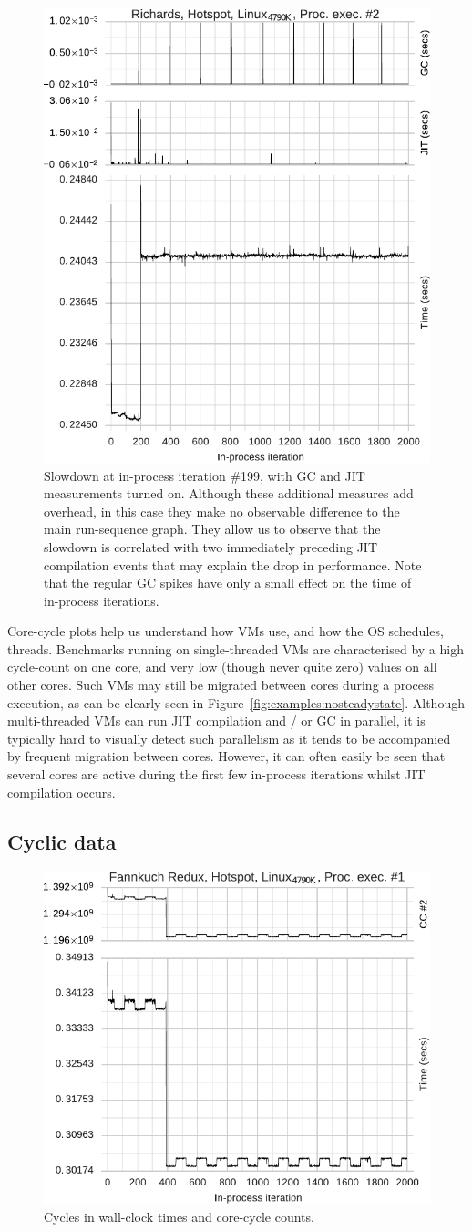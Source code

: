 \documentclass[preprint,numbers,10pt]{sigplanconf}
\begin{document}
\begin{figure}[t]
\centering
\includegraphics[width=.45\textwidth]{examples/new_miscomp.pdf}
\caption{Slowdown at in-process iteration \#199, with GC and JIT measurements
turned on. Although these additional measures add overhead, in this
case they make no observable difference to the main run-sequence graph. They
allow us to observe that the slowdown is correlated with two immediately preceding JIT compilation events
that may explain the drop in performance. Note that the
regular GC spikes have only a small effect on the time of in-process
iterations.}
\label{fig:examples:slowdown1}
\end{figure}

Core-cycle plots help us understand how VMs use, and how the OS schedules,
threads. Benchmarks running on single-threaded VMs are characterised by a high
cycle-count on one core, and very low (though never quite zero) values on all
other cores. Such VMs may still be migrated between cores during a process
execution, as can be clearly seen in Figure~\ref{fig:examples:nosteadystate}.
Although multi-threaded VMs can run JIT compilation and / or GC in parallel,
it is typically hard to visually detect such parallelism as it tends to be
accompanied by frequent migration between cores.
However, it can often easily be seen that several cores are active during the first few
in-process iterations whilst JIT compilation occurs.


\subsection{Cyclic data}

\begin{figure}[tbp]
\centering
\includegraphics[width=.45\textwidth]{examples/new_cyclic.pdf}
\caption{Cycles in wall-clock times and core-cycle counts.}
\label{fig:examples:cycles}
\end{figure}
\end{document}
